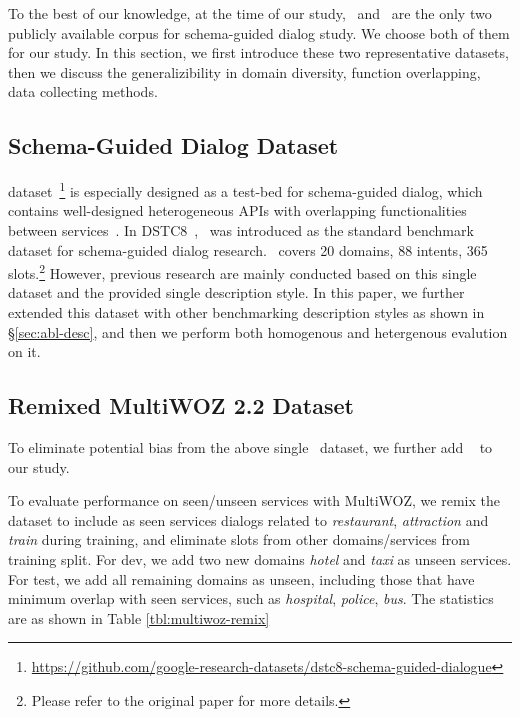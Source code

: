 To the best of our knowledge, at the time of our study, \sgdst~and
\multiwoz~are the only two publicly available corpus for schema-guided
dialog study. We choose both of them for our study. In this section,
we first introduce these two representative datasets, then we discuss
the generalizibility in domain diversity, function overlapping, data
collecting methods.

\subsection{Schema-Guided Dialog Dataset}
\label{ssec:sgd:schema-dataset}
\sgdst
dataset~\footnote{\url{https://github.com/google-research-datasets/dstc8-schema-guided-dialogue}}
is especially designed as a test-bed for schema-guided dialog, which
contains well-designed heterogeneous APIs with overlapping
functionalities between services~\cite{rastogi2019towards}. In
DSTC8~\cite{rastogi2020schema}, \sgdst~was introduced as the standard
benchmark dataset for schema-guided dialog research. \sgdst~covers 20
domains, 88 intents, 365 slots.\footnote{Please refer to the original
  paper for more details.} However, previous research are mainly
conducted based on this single dataset and the provided single
description style. In this paper, we further extended this dataset
with other benchmarking description styles as shown in
\S\ref{sec:abl-desc}, and then we perform both homogenous and
hetergenous evalution on it.

\subsection{Remixed MultiWOZ 2.2 Dataset}
\label{ssec:sgd:multiwoz-dataset}

To eliminate potential bias from the above single \sgdst~dataset, we
further add \multiwoz~\cite{zang-etal-2020-multiwoz} to our study.

 To evaluate performance on
seen/unseen services with MultiWOZ, we remix the \multiwoz dataset to
include as seen services dialogs related to \textit{restaurant},
\textit{attraction} and \textit{train} during training, and eliminate
slots from other domains/services from training split.  For dev, we
add two new domains {\it hotel} and {\it taxi} as unseen services. For
test, we add all remaining domains as unseen, including those that
have minimum overlap with seen services, such as {\it hospital}, {\it
  police}, {\it bus}. The statistics are as shown in Table
\ref{tbl:multiwoz-remix}

